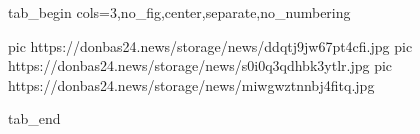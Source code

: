  
 
 
 
 


\ifcmt
  tab_begin cols=3,no_fig,center,separate,no_numbering

     pic https://donbas24.news/storage/news/ddqtj9jw67pt4cfi.jpg
     pic https://donbas24.news/storage/news/s0i0q3qdhbk3ytlr.jpg
     pic https://donbas24.news/storage/news/miwgwztnnbj4fitq.jpg

  tab_end
\fi
